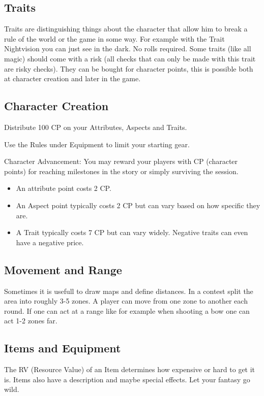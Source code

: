\documentclass[11pt]{article}
\begin{document}
{\subsection{Traits}
\label{sec:org0d92ec6}
Traits are distinguishing things about the character that allow him to break a rule of the world or the game in some way. For example with the Trait Nightvision you can just see in the dark. No rolls required. Some traits (like all magic) should come with a risk (all checks that can only be made with this trait are risky checks). They can be bought for character points, this is possible both at character creation and later in the game.

\subsection{Character Creation}
\label{sec:org9ddfc80}
Distribute 100 CP on your Attributes, Aspects and Traits.

Use the Rules under Equipment to limit your starting gear.

Character Advancement:
You may reward your players with CP (character points) for reaching milestones in the story or simply surviving the session.

\begin{itemize}
\item An attribute point costs 2 CP.
\item An Aspect point typically costs 2 CP but can vary based on how specific they are.
\item A Trait typically costs 7 CP but can vary widely. Negative traits can even have a negative price.
\end{itemize}

\subsection{Movement and Range}
\label{sec:org5f7cd53}
Sometimes it is usefull to draw maps and define distances. In a contest split the area into roughly 3-5 zones. A player can move from one zone to another each round. If one can act at a range like for example when shooting a bow one can act 1-2 zones far. 

\subsection{Items and Equipment}
\label{sec:org3aaa256}
The RV (Resource Value) of an Item determines how expensive or hard to get it is. Items also have a description and maybe special effects. Let your fantasy go wild.

}
\end{document}
